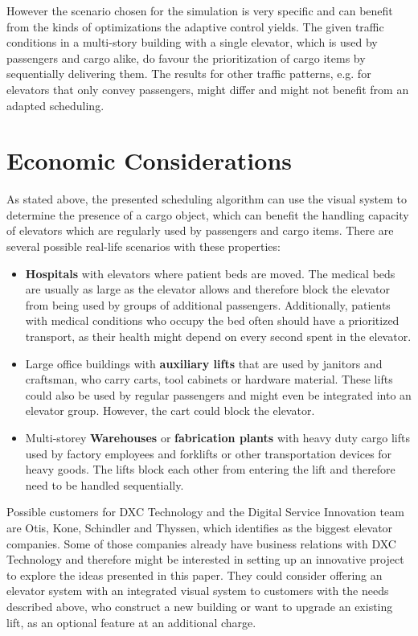 However the scenario chosen for the simulation is very specific and can benefit from the kinds of optimizations the adaptive control yields. 
The given traffic conditions in a multi-story building with a single elevator, 
which is used by passengers and cargo alike, 
do favour the prioritization of cargo items by sequentially delivering them.
The results for other traffic patterns, e.g. for elevators that only convey passengers,
might differ and might not benefit from an adapted scheduling.

\section{Economic Considerations}
As stated above, the presented scheduling algorithm can use the visual system to determine the presence of a cargo object, which can benefit the handling capacity of elevators which are regularly used by passengers and cargo items.
There are several possible real-life scenarios with these properties:
\begin{itemize}
    \item \textbf{Hospitals} with elevators where patient beds are moved. The medical beds are usually as large as the elevator allows and therefore block the elevator from being used by groups of additional passengers. Additionally, patients with medical conditions who occupy the bed often should have a prioritized transport, as their health might depend on every second spent in the elevator. 
    \item Large office buildings with \textbf{auxiliary lifts} that are used by janitors and craftsman, who carry carts, tool cabinets or hardware material. These lifts could also be used by regular passengers and might even be integrated into an elevator group. However, the cart could block the elevator.
    \item Multi-storey \textbf{Warehouses} or \textbf{fabrication plants} with heavy duty cargo lifts used 
    by factory employees and forklifts or other transportation devices for heavy goods. The lifts block each other from entering the lift and therefore need to be handled sequentially. 
\end{itemize}

Possible customers for DXC Technology and the Digital Service Innovation team are Otis, Kone, Schindler and Thyssen, which \textcite[][p.~4]{unger2015aufzuege} identifies as the biggest elevator companies. Some of those companies already have business relations with DXC Technology and therefore might be interested in setting up an innovative project to explore the ideas presented in this paper.
They could consider offering an elevator system with an integrated visual system to customers with the needs described above, who construct a new building or want to upgrade an existing lift, as an optional feature at an additional charge.

